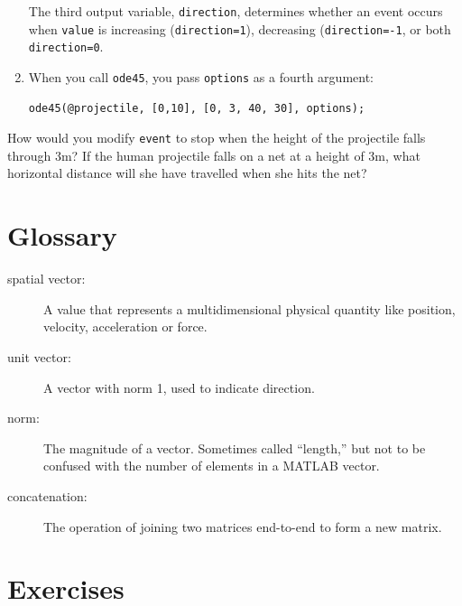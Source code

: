 \documentclass[
]{book}
\begin{document}
\begin{enumerate}
The third output variable, {\tt direction}, determines whether an event
        occurs when {\tt value} is increasing ({\tt direction=1}),
        decreasing ({\tt direction=-1}, or both {\tt direction=0}.



\item When you call {\tt ode45}, you pass {\tt options} as a fourth
argument:

\begin{verbatim}
ode45(@projectile, [0,10], [0, 3, 40, 30], options);
\end{verbatim}
%
\end{enumerate}

\begin{ex}
How would you modify {\tt event} to stop when the height of
the projectile falls through 3m?
If the human projectile falls on a net at a height of 3m, what
horizontal distance will she have travelled when she hits the
net?
\end{ex}

\section{Glossary}

\begin{description}

\item[spatial vector:] A value that represents a
multidimensional physical quantity like position, velocity,
acceleration or force.

\item[unit vector:] A vector with norm 1, used to indicate
direction.

\item[norm:] The magnitude of a vector.  Sometimes called ``length,''
but not to be confused with the number of elements in a MATLAB
vector.
\item[concatenation:] The operation of joining two matrices end-to-end to
form a new matrix.


\end{description}

\section{Exercises}
\end{document}
